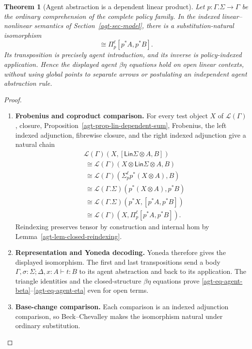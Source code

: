 \documentclass[11pt,a4paper]{article}
\numberwithin{equation}{section}
\newtheorem{theorem}{Theorem}[section]
\theoremstyle{definition}
\theoremstyle{remark}
\theoremstyle{plain}
\providecommand{\Lin}{\mathsf{Lin}}
\providecommand{\cL}{\mathcal{L}}
\begin{document}
\begin{theorem}[Agent abstraction is a dependent linear product]
\label{agt-thm-agent-dependent-product}
Let $p:\Gamma.\Sigma\to\Gamma$ be the ordinary comprehension of the
complete policy family. In the indexed linear--nonlinear semantics of
Section~\ref{agt-sec-model}, there is a substitution-natural isomorphism
\begin{equation}
 [\Lin_\Gamma\Sigma\otimes A,B]
 \cong\Pi_p^\ell[p^*A,p^*B].
 \label{agt-eq-agent-dependent-product}
\end{equation}
Its transposition is precisely agent introduction, and its inverse is
policy-indexed application. Hence the displayed agent $\beta\eta$
equations hold on open linear contexts, without using global points to
separate arrows or postulating an independent agent abstraction rule.
\end{theorem}
\begin{proof}
\leavevmode
\begin{enumerate}[label=\textup{(\arabic*)},leftmargin=*,itemsep=4pt,topsep=3pt]
  \item \textbf{Frobenius and coproduct comparison.} For every test object $X$ of $\cL(\Gamma)$, closure,
Proposition~\ref{agt-prop-lin-dependent-sum}, Frobenius, the left indexed
adjunction, fibrewise closure, and the right indexed adjunction give a
natural chain
\begin{align*}
 &\cL(\Gamma)(X,[\Lin\Sigma\otimes A,B])\\
 &\ \cong\cL(\Gamma)(X\otimes\Lin\Sigma\otimes A,B)\\
 &\ \cong\cL(\Gamma)(\Sigma_p^\ell p^*(X\otimes A),B)\\
 &\ \cong\cL(\Gamma.\Sigma)(p^*(X\otimes A),p^*B)\\
 &\ \cong\cL(\Gamma.\Sigma)(p^*X,[p^*A,p^*B])\\
 &\ \cong\cL(\Gamma)(X,\Pi_p^\ell[p^*A,p^*B]).
\end{align*}
Reindexing preserves tensor by construction and internal hom by
Lemma~\ref{agt-lem-closed-reindexing}.
  \item \textbf{Representation and Yoneda decoding.} Yoneda therefore gives the
displayed isomorphism. The first and last transpositions send a
body $\Gamma,\sigma:\Sigma;\Delta,x:A\vdash t:B$ to its agent
abstraction and back to its application. The triangle identities and the
closed-structure $\beta\eta$ equations prove
\eqref{agt-eq-agent-beta}--\eqref{agt-eq-agent-eta} even for open terms.
  \item \textbf{Base-change comparison.} Each comparison is an indexed adjunction comparison, so
Beck--Chevalley makes the isomorphism natural under ordinary substitution.
\end{enumerate}
\end{proof}
\end{document}
